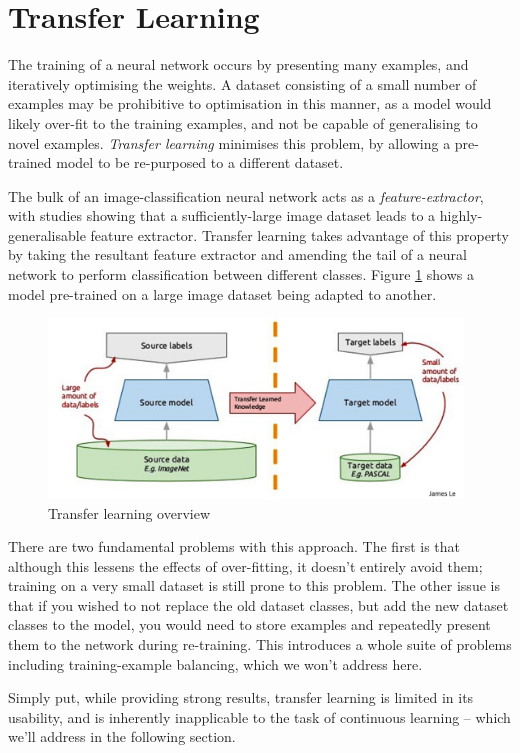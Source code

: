 \documentclass{report}
\begin{document}
	\section{Transfer Learning}
	The training of a neural network occurs by presenting many examples, and iteratively optimising the weights. A dataset consisting of a small number of examples may be prohibitive to optimisation in this manner, as a model would likely over-fit to the training examples, and not be capable of generalising to novel examples. \emph{Transfer learning} minimises this problem, by allowing a pre-trained model to be re-purposed to a different dataset. \par
	The bulk of an image-classification neural network acts as a \emph{feature-extractor}, with studies\parencite{extractors} showing that a sufficiently-large image dataset leads to a highly-generalisable feature extractor. Transfer learning takes advantage of this property by taking the resultant feature extractor and amending the tail of a neural network to perform classification between different classes. Figure \ref{fig:transferlearning:1} shows a model pre-trained on a large image dataset being adapted to another. \par
	\begin{figure}[h]
		\centering
		\includegraphics[width=11cm]{transferlearning}
		\caption{Transfer learning overview}
		\label{fig:transferlearning:1}
	\end{figure}
	There are two fundamental problems with this approach. The first is that although this lessens the effects of over-fitting, it doesn't entirely avoid them; training on a very small dataset is still prone to this problem. The other issue is that if you wished to not replace the old dataset classes, but add the new dataset classes to the model, you would need to store examples and repeatedly present them to the network during re-training. This introduces a whole suite of problems including training-example balancing, which we won't address here. \par
	Simply put, while providing strong results, transfer learning is limited in its usability, and is inherently inapplicable to the task of continuous learning -- which we'll address in the following section. \par
	
\end{document}
